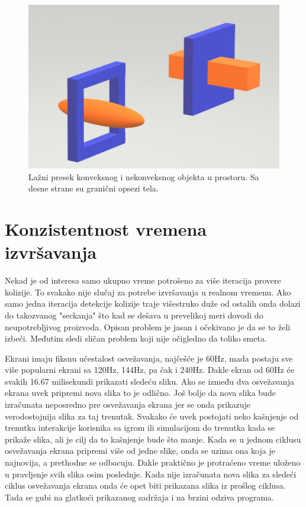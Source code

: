 \documentclass[12pt,oneside]{memoir}
\begin{document}
\begin{figure}[h!]
	\begin{center}
	\includegraphics[scale=0.5]{falseCollision.jpg}
	\end{center}
	\caption{Lažni presek konveksnog i nekonveksnog objekta u prostoru. 
	Sa desne strane su granični opsezi tela. }
	\label{fig:falseCollision}
\end{figure}


\section{Konzistentnost vremena izvršavanja}

Nekad je od interesa samo ukupno vreme potrošeno za više iteracija provere kolizije.
To svakako nije slučaj za potrebe izvršavanja u realnom vremenu. Ako samo jedna iteracija 
detekcije kolizije traje višestruko duže od ostalih onda dolazi do takozvanog "seckanja" što
kad se dešava  u prevelikoj meri dovodi do neupotrebljivog proizvoda.
Opisan problem je jasan i očekivano je da se to želi izbeći. 
Međutim sledi sličan problem koji nije očigledno da toliko smeta.

Ekrani imaju fiksnu učestalost osvežavanja, najčešće je 60Hz, mada postaju sve više popularni 
ekrani sa 120Hz, 144Hz, pa čak i 240Hz. Dakle ekran od 60Hz će svakih 
16.67 milisekundi prikazati sledeću sliku. Ako se između dva osvežavanja ekrana uvek pripremi
nova slika to je odlično. 
Još bolje da nova slika bude izračunata neposredno pre osvežavanja ekrana jer se onda 
prikazuje verodostojnija slika za taj trenutak. 
Svakako će uvek postojati neko kašnjenje od trenutka interakcije korisnika sa igrom ili simulacijom do
trenutka kada se prikaže slika, ali je cilj da to kašnjenje bude što manje. 
Kada se u jednom ciklusu osvežavanja ekrana pripremi više od jedne slike, onda se uzima ona koja je najnovija,
a prethodne se odbacuju. 
Dakle praktično je protraćeno vreme uloženo u pravljenje svih slika osim poslednje.
Kada nije izračunata nova slika za sledeći ciklus osvežavanja ekrana onda će opet biti prikazana slika
iz prošlog ciklusa. Tada se gubi na glatkoći prikazanog sadržaja i na brzini odziva programa. 
\end{document}
